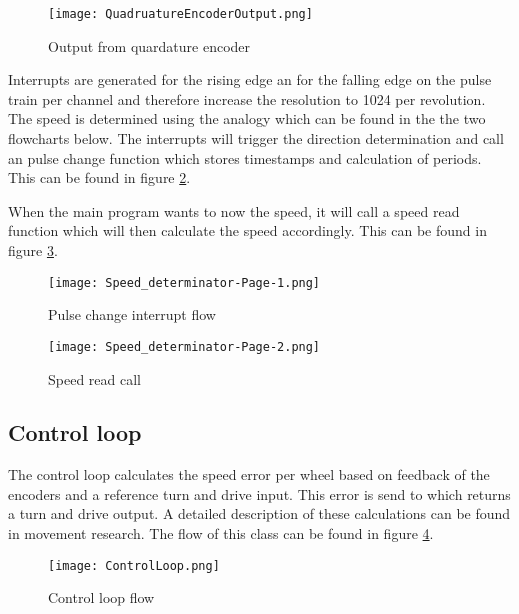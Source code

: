 \begin{figure}[H]
\centering
\texttt{[image: QuadruatureEncoderOutput.png]}
\caption{Output from quardature encoder}
\label{fig::QuadEnc}
\end{figure}


Interrupts are generated for the rising edge an for the falling edge on the pulse train per channel and therefore increase the resolution to 1024 per revolution. 
The speed is determined using the analogy which can be found in the the two flowcharts below. The interrupts will trigger the direction determination and call an pulse change function which stores timestamps and calculation of periods. This can be found in figure \ref{fig::PCF}.

When the main program wants to now the speed, it will call a speed read function which will then calculate the speed accordingly. This can be found in figure \ref{fig::SRC}.

\begin{figure}[H]
\centering
\texttt{[image: Speed\_determinator-Page-1.png]}
\caption{Pulse change interrupt flow}
\label{fig::PCF}
\end{figure}


\begin{figure}[H]
\centering
\texttt{[image: Speed\_determinator-Page-2.png]}
\caption{Speed read call}
\label{fig::SRC}
\end{figure}

\subsection{Control loop}
The control loop calculates the speed error per wheel based on feedback of the encoders and a reference turn and drive input. 
This error is send to  which returns a turn and drive output. 
A detailed description of these calculations can be found in movement research. 
The flow of this class can be found in figure \ref{fig::CLF}.

\begin{figure}[H]
\centering
\texttt{[image: ControlLoop.png]}
\caption{Control loop flow}
\label{fig::CLF}
\end{figure}

